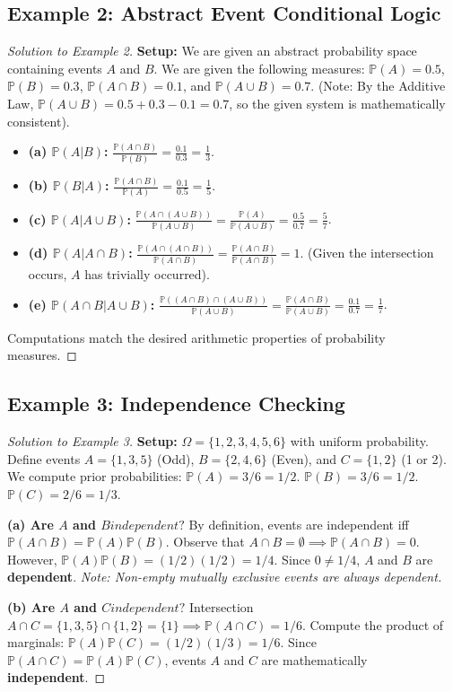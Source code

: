 \documentclass[12pt, a4paper]{article}
\theoremstyle{definition}
\theoremstyle{remark}
\newcommand{\Prob}{\mathbb{P}}
\newcommand{\W}{\Omega}
\newcommand{\1}{\mathbf{1}}
\begin{document}
\subsection*{Example 2: Abstract Event Conditional Logic}
\begin{proof}[Solution to Example 2]
\textbf{Setup:} We are given an abstract probability space containing events $A$ and $B$. We are given the following measures: $\Prob(A) = 0.5$, $\Prob(B) = 0.3$, $\Prob(A \cap B) = 0.1$, and $\Prob(A \cup B) = 0.7$. 
(Note: By the Additive Law, $\Prob(A \cup B) = 0.5 + 0.3 - 0.1 = 0.7$, so the given system is mathematically consistent).

\begin{itemize}[leftmargin=*]
    \item \textbf{(a) $\Prob(A|B)$:} $\frac{\Prob(A \cap B)}{\Prob(B)} = \frac{0.1}{0.3} = \frac{1}{3}$.
    \item \textbf{(b) $\Prob(B|A)$:} $\frac{\Prob(A \cap B)}{\Prob(A)} = \frac{0.1}{0.5} = \frac{1}{5}$.
    \item \textbf{(c) $\Prob(A | A \cup B)$:} $\frac{\Prob(A \cap (A \cup B))}{\Prob(A \cup B)} = \frac{\Prob(A)}{\Prob(A \cup B)} = \frac{0.5}{0.7} = \frac{5}{7}$.
    \item \textbf{(d) $\Prob(A | A \cap B)$:} $\frac{\Prob(A \cap (A \cap B))}{\Prob(A \cap B)} = \frac{\Prob(A \cap B)}{\Prob(A \cap B)} = 1$. (Given the intersection occurs, $A$ has trivially occurred).
    \item \textbf{(e) $\Prob(A \cap B | A \cup B)$:} $\frac{\Prob((A \cap B) \cap (A \cup B))}{\Prob(A \cup B)} = \frac{\Prob(A \cap B)}{\Prob(A \cup B)} = \frac{0.1}{0.7} = \frac{1}{7}$.
\end{itemize}
Computations match the desired arithmetic properties of probability measures.
\end{proof}

\subsection*{Example 3: Independence Checking}
\begin{proof}[Solution to Example 3]
\textbf{Setup:} $\W = \{1,2,3,4,5,6\}$ with uniform probability. Define events $A = \{1,3,5\}$ (Odd), $B = \{2,4,6\}$ (Even), and $C = \{1,2\}$ (1 or 2). We compute prior probabilities:
$\Prob(A) = 3/6 = 1/2$. $\Prob(B) = 3/6 = 1/2$. $\Prob(C) = 2/6 = 1/3$.

\textbf{(a) Are $A$ and $B independent?$}
By definition, events are independent iff $\Prob(A \cap B) = \Prob(A)\Prob(B)$.
Observe that $A \cap B = \emptyset \implies \Prob(A \cap B) = 0$.
However, $\Prob(A)\Prob(B) = (1/2)(1/2) = 1/4$.
Since $0 \neq 1/4$, $A$ and $B$ are \textbf{dependent}. \textit{Note: Non-empty mutually exclusive events are always dependent.}

\textbf{(b) Are $A$ and $C independent?$}
Intersection $A \cap C = \{1,3,5\} \cap \{1,2\} = \{1\} \implies \Prob(A \cap C) = 1/6$.
Compute the product of marginals: $\Prob(A)\Prob(C) = (1/2)(1/3) = 1/6$.
Since $\Prob(A \cap C) = \Prob(A)\Prob(C)$, events $A$ and $C$ are mathematically \textbf{independent}.
\end{proof}
\end{document}
